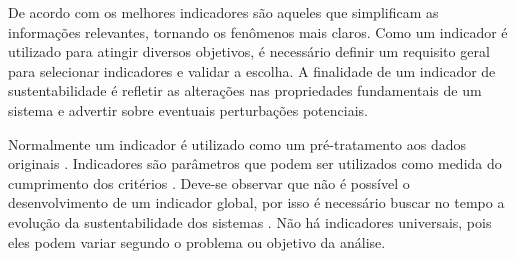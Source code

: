 De acordo com \citep{gallopin1996environmental} os melhores indicadores
são aqueles que simplificam as informações relevantes, tornando os
fenômenos mais claros. Como um indicador é utilizado para atingir
diversos objetivos, é necessário definir um requisito geral para selecionar
indicadores e validar a escolha. A finalidade de um indicador de sustentabilidade
é refletir as alterações nas propriedades fundamentais de um sistema
\citet{CaminoAndMuller1993} e advertir sobre eventuais perturbações
potenciais.\citep{ferraz2003}

Normalmente um indicador é utilizado como um pré-tratamento aos dados
originais \citet{SicheAgostinho2007}. Indicadores são parâmetros
que podem ser utilizados como medida do cumprimento dos critérios
\citep{moret2006criterios}. Deve-se observar que não é possível o
desenvolvimento de um indicador global, por isso é necessário buscar
no tempo a evolução da sustentabilidade dos sistemas \citep{CaminoAndMuller1993}.
Não há indicadores universais, pois eles podem variar segundo o problema
ou objetivo da análise.

